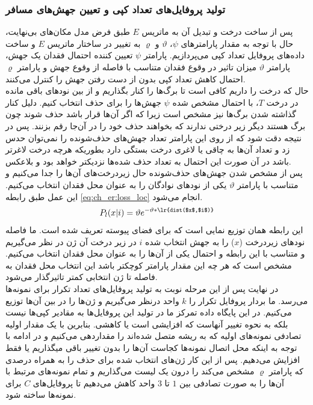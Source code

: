 \subsubsection{تولید پروفایل‌های تعداد کپی و تعیین جهش‌های مسافر}
پس از ساخت درخت و تبدیل آن به ماتریس $E$ طبق فرض مدل مکان‌های بی‌نهایت، حال با توجه به مقدار پارامترهای $\psi$، $\vartheta$ و $\varrho$ به تغییر در ساختار ماتریس $E$ و ساخت داده‌های پروفایل تعداد کپی می‌پردازیم.
پارامتر $\psi$ تعیین ‌کننده احتمال فقدان یک جهش، پارامتر $\vartheta$ میزان تاثیر در وقوع فقدان متناسب با فاصله از وقوع جهش و پارامتر $\varrho$ احتمال کاهش تعداد کپی بدون از دست رفتن جهش را کنترل می‌کنند.
\\
حال که درخت را داریم کافی است تا برگ‌ها را کنار بگذاریم و از بین نود‌های باقی مانده در درخت $T$، با احتمال مشخص شده $\psi$ جهش‌ها را برای حذف انتخاب ‌کنیم. دلیل کنار گذاشته شدن برگ‌ها نیز مشخص است زیرا که اگر آن‌ها قرار باشد حذف شوند چون برگ هستند دیگر زیر درختی ندارند که بخواهند حذف خود را در آن‌جا رقم بزنند. پس در نتیجه دقت شود که از روی این پارامتر تعداد جهش‌های حذف‌شونده را نمی‌توان حدس زد و تعداد آن‌ها به چاقی یا لاغری درخت بستگی دارد بطوریکه هرچه درخت لاغرتر باشد در آن صورت این احتمال به تعداد حذف شده‌ها نزدیکتر خواهد بود و بلاعکس.\\
پس از مشخص شدن جهش‌های حذف‌شونده حال زیردرخت‌های آن‌ها را جدا می‌کنیم و متناسب با پارامتر $\vartheta$ یکی از نودهای نوادگان را به عنوان محل فقدان انتخاب می‌کنیم. این عمل طبق رابطه \ref{eq:ch_er:loss_loc} انجام می‌شود.
\begin{equation}
	P_l(x|i) = \vartheta e^{-\vartheta *\text{\lr{dist($x$,$i$)}}}
	\label{eq:ch_er:loss_loc}
\end{equation}
این رابطه همان توزیع نمایی است که برای فضای پیوسته تعریف شده است. ما فاصله نودهای زیردرخت ($x$) را به جهش انتخاب شده $i$ در زیر درخت آن ژن در نظر می‌گیریم و متناسب با این رابطه و احتمال یکی از آن‌ها را به عنوان محل فقدان انتخاب می‌کنیم. مشخص است که هر چه این مقدار پارامتر کوچکتر باشد این انتخاب محل فقدان به فاصله تا ژن انتخابی کمتر تاثیرگذار می‌شود.
\\
در نهایت پس از این مرحله نوبت به تولید پروفایل‌های تعداد تکرار برای نمونه‌ها می‌رسد. ما بردار پروفایل تکرار را $k$ واحد درنظر می‌گیریم و ژن‌ها را در بین آن‌ها توزیع می‌کنیم. در این پایگاه داده تمرکز ما در تولید این پروفایل‌ها به مقادیر کپی‌ها نیست بلکه به نحوه تغییر آنهاست که افزایشی است یا کاهشی. بنابرین با یک مقدار اولیه تصادفی نمونه‌های اولیه که به ریشه متصل شده‌اند را مقداردهی می‌کنیم و در ادامه با توجه به اینکه محل اتصال نمونه‌ها کجاست آن‌ها را بدون تغییر باقی میگذاریم یا فقط افزایش می‌دهیم. پس از این کار ژن‌های انتخاب شده برای حذف را به همراه درصدی که پارامتر $\varrho$ مشخص می‌کند را درون یک لیست می‌گذاریم و تمام نمونه‌های مرتبط با آن‌ها را به صورت تصادفی بین $1$ تا $3$ واحد کاهش می‌دهیم تا پروفایل‌های $C$ برای نمونه‌ها ساخته شود.\\
